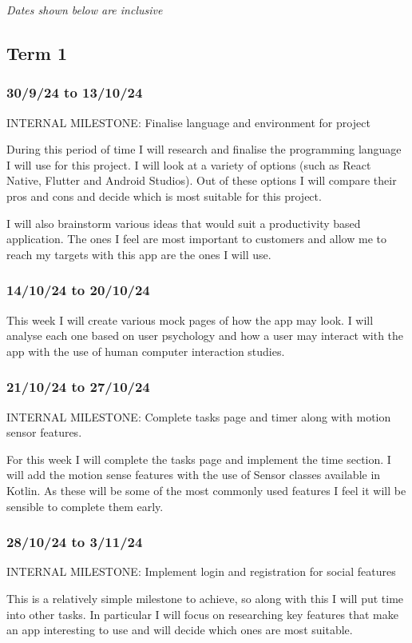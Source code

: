 \documentclass[12pt]{article}
\begin{document}
\textit{Dates shown below are inclusive}

\subsection{Term 1}
\subsubsection{30/9/24 to 13/10/24}
INTERNAL MILESTONE: Finalise language and environment for project

During this period of time I will research and finalise the programming language I will use for this project. I will look at a variety of options (such as React Native, Flutter and Android Studios). Out of these options I will compare their pros and cons and decide which is most suitable for this project.

I will also brainstorm various ideas that would suit a productivity based application. The ones I feel are most important to customers and allow me to reach my targets with this app are the ones I will use. 

\subsubsection{14/10/24 to 20/10/24}
This week I will create various mock pages of how the app may look. I will analyse each one based on user psychology and how a user may interact with the app with the use of human computer interaction studies.

\subsubsection{21/10/24 to 27/10/24}
INTERNAL MILESTONE: Complete tasks page and timer along with motion sensor features.

For this week I will complete the tasks page and implement the time section. I will add the motion sense features with the use of Sensor classes available in Kotlin. As these will be some of the most commonly used features I feel it will be sensible to complete them early.

\subsubsection{28/10/24 to 3/11/24}
INTERNAL MILESTONE: Implement login and registration for social features

This is a relatively simple milestone to achieve, so along with this I will put time into other tasks. In particular I will focus on researching key features that make an app interesting to use and will decide which ones are most suitable. 
\end{document}
